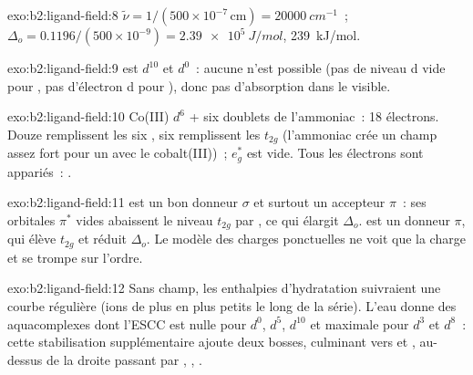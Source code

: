 \begin{solution}{exo:b2:ligand-field:8}
$\tilde\nu = 1/(500 \times 10^{-7}\,\text{cm}) = \qty{20000}{cm^{-1}}$~; $\Delta_o =
0.1196/(500 \times 10^{-9}) = \qty{2.39e5}{J/mol}$, \qty{239}{kJ/mol}.
\end{solution}

\begin{solution}{exo:b2:ligand-field:9}
 est $d^{10}$ et  $d^0$~: aucune  n'est possible (pas de niveau d vide
pour , pas d'électron d pour ), donc pas d'absorption dans le visible.
\end{solution}

\begin{solution}{exo:b2:ligand-field:10}
Co(III) $d^6$ + six doublets de l'ammoniac~: 18 électrons. Douze remplissent les six ,
six remplissent les  $t_{2g}$ (l'ammoniac crée un champ assez fort pour un  avec
le cobalt(III))~; $e_g^*$ est vide. Tous les électrons sont appariés~: .
\end{solution}

\begin{solution}{exo:b2:ligand-field:11}
 est un bon donneur $\sigma$ et surtout un accepteur $\pi$~: ses orbitales $\pi^*$ vides
abaissent le niveau $t_{2g}$ par , ce qui élargit $\Delta_o$.  est un donneur $\pi$, qui
élève $t_{2g}$ et réduit $\Delta_o$. Le modèle des charges ponctuelles ne voit que la charge et se trompe
sur l'ordre.
\end{solution}

\begin{solution}{exo:b2:ligand-field:12}
Sans champ, les enthalpies d'hydratation suivraient une courbe régulière (ions de plus en plus petits le long de
la série). L'eau donne des aquacomplexes  dont l'ESCC est nulle pour $d^0$, $d^5$, $d^{10}$
et maximale pour $d^3$ et $d^8$~: cette stabilisation supplémentaire ajoute deux bosses, culminant vers
 et , au-dessus de la droite passant par , , .
\end{solution}

